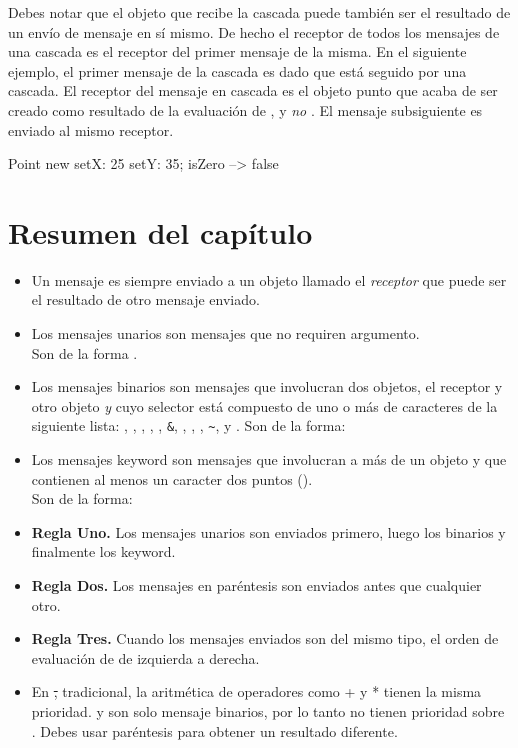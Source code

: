 \documentclass[a4paper,10pt,twoside]{book}
\begin{document}
Debes notar que el objeto que recibe la cascada puede también ser el resultado de un envío de mensaje en sí mismo.
De hecho el receptor de todos los mensajes de una cascada es el receptor del primer mensaje de la misma. En el siguiente ejemplo, el primer mensaje de la cascada es  dado que está seguido por una cascada. El receptor del mensaje en cascada  es el objeto punto que acaba de ser creado como resultado de la evaluación de , y \emph{no} . El mensaje subsiguiente  es enviado al mismo receptor.

\begin{code}{}
Point new setX: 25 setY: 35; isZero --> false
\end{code}

\section{Resumen del capítulo}

\begin{itemize}
\item Un mensaje es siempre enviado a un objeto llamado el \emph{receptor} que puede ser el resultado de otro mensaje enviado.

\item Los mensajes unarios son mensajes que no requiren argumento.\\
Son de la forma .

\item Los mensajes binarios son mensajes que involucran dos objetos, el receptor y otro objeto \emph{y} cuyo selector está compuesto de uno o más de caracteres de la siguiente lista: \ct{+}, \ct{-}, \ct{*}, \ct{/}, \ct{|}, \texttt{\&}, \ct{=}, \ct{>}, \ct{<}, \texttt{\~}, y .
Son de la forma: 

\item Los mensajes keyword son mensajes que involucran a más de un objeto y que contienen al menos un caracter dos puntos (\ct{:}). \\
Son de la forma:

\item \textbf{Regla Uno.} Los mensajes unarios son enviados primero, luego los binarios y finalmente los keyword.
\item \textbf{Regla Dos.} Los mensajes en paréntesis son enviados antes que cualquier otro.
\item \textbf{Regla Tres.} Cuando los mensajes enviados son del  mismo tipo, el orden de evaluación de de izquierda a derecha.
\item En \st, tradicional, la aritmética de operadores como + y * tienen la misma prioridad. \ct{+} y \ct{*} son solo mensaje binarios, por lo tanto \ct{*} no tienen prioridad sobre \ct{+}. Debes usar paréntesis para obtener un resultado diferente.
\end{itemize}

\ifx\wholebook\relax\else
\end{document}
